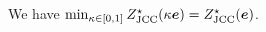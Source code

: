 \documentclass[nonblindrev]{informs2017}
\newcommand{\1}[1]{\mathds{1}{\left(#1\right)}}
\begin{document}
\begin{proposition}\label{prop:cvar best_2}
We have $\min_{\kappa \in [0,1]} Z^\star_{\rm JCC}(\kappa\bm{e})= Z^\star_{\rm JCC}(\bm{e})$.
\end{proposition}
%
%
\end{document}

